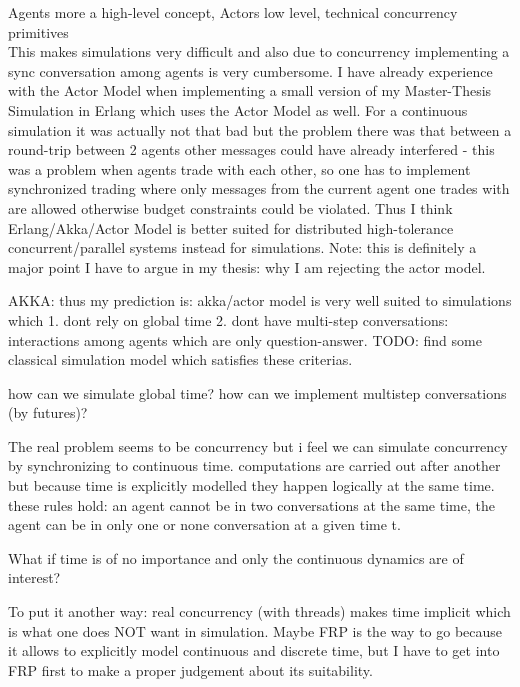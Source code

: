 Agents more a high-level concept, Actors low level, technical concurrency primitives\\

This makes simulations very difficult and also due to concurrency implementing a sync conversation among agents is very cumbersome. I have already experience with the Actor Model when implementing a small version of my Master-Thesis Simulation in Erlang which uses the Actor Model as well. For a continuous simulation it was actually not that bad but the problem there was that between a round-trip between 2 agents other messages could have already interfered - this was a problem when agents trade with each other, so one has to implement synchronized trading where only messages from the current agent one trades with are allowed otherwise budget constraints could be violated. Thus I think Erlang/Akka/Actor Model is better suited for distributed high-tolerance concurrent/parallel systems instead for simulations. Note: this is definitely a major point I have to argue in my thesis: why I am rejecting the actor model.

AKKA: thus my prediction is: akka/actor model is very well suited to simulations which 1. dont rely on global time 2. dont have multi-step conversations: interactions among agents which are only question-answer. TODO: find some classical simulation model which satisfies these criterias.

how can we simulate global time? how can we implement multistep conversations (by futures)?

The real problem seems to be concurrency but i feel we can simulate concurrency by synchronizing to continuous time. computations are carried out after another but because time is explicitly modelled they happen logically at the same time. these rules hold: an agent cannot be in two conversations at the same time, the agent can be in only one or none conversation at a given time t.

What if time is of no importance and only the continuous dynamics are of interest?

To put it another way: real concurrency (with threads) makes time implicit which is what one does NOT want in simulation. Maybe FRP is the way to go because it allows to explicitly model continuous and discrete time, but I have to get into FRP first to make a proper judgement about its suitability.


